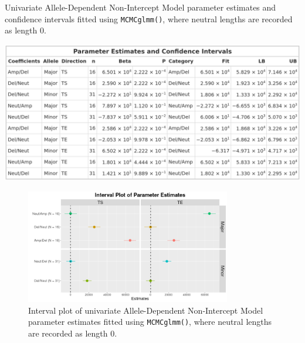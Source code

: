 \begin{table}[!htb]
\centering
\caption[Univariate Allele-Dependent Non-Intercept Model parameter estimates and confidence intervals fitted using \texttt{MCMCglmm()}.]{Univariate Allele-Dependent Non-Intercept Model parameter estimates and confidence intervals fitted using \texttt{MCMCglmm()}, where neutral lengths are recorded as length 0.}
      
\includegraphics[width = 1\textwidth]{../tables/Chapter_5/Univariate_MCMC_6_AD_Model_Pred.png}
\end{table}

\begin{figure}[!htb]
\vspace{0.5cm}
     
\centering
\includegraphics[width = 0.8\textwidth]{../figures/Chapter_5/Univariate_MCMC_6_AD_Interval.png}
 
\caption[Interval plot of univariate Allele-Dependent Non-Intercept Model parameter estimates fitted using \texttt{MCMCglmm()}.]{Interval plot of univariate Allele-Dependent Non-Intercept Model parameter estimates fitted using \texttt{MCMCglmm()}, where neutral lengths are recorded as length 0.}
\end{figure}

